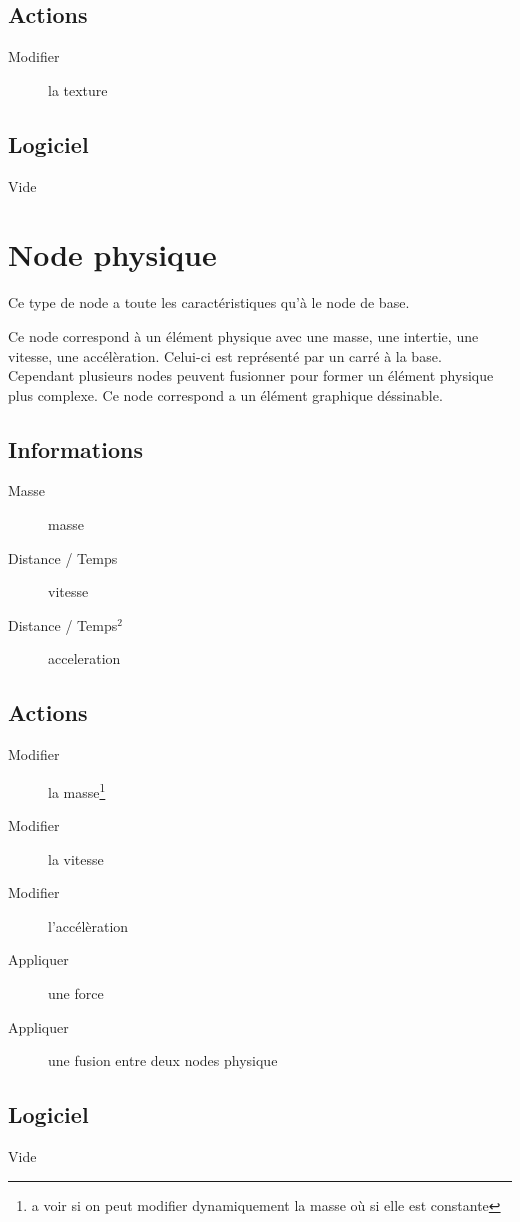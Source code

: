 \documentclass[11pt, a4paper]{article}
\begin{document}
\subsection{Actions}
\begin{description}
\item[Modifier] la texture
\end{description}

\subsection{Logiciel}
Vide

\section{Node physique}
Ce type de node a toute les caractéristiques qu'à le node de base.

Ce node correspond à un élément physique avec une masse, une intertie, une vitesse, une accélèration.
Celui-ci est représenté par un carré à la base. Cependant plusieurs nodes peuvent fusionner pour former un élément physique plus complexe.
Ce node correspond a un élément graphique déssinable.

\subsection{Informations}
\begin{description}
\item[Masse] masse
\item[Distance / Temps] vitesse
\item[Distance / Temps$^2$] acceleration
\end{description}

\subsection{Actions}
\begin{description}
\item[Modifier] la masse\footnote{a voir si on peut modifier dynamiquement la masse où si elle est constante}
\item[Modifier] la vitesse
\item[Modifier] l'accélèration
\item[Appliquer] une force
\item[Appliquer] une fusion entre deux nodes physique
\end{description}

\subsection{Logiciel}
Vide
\end{document}
